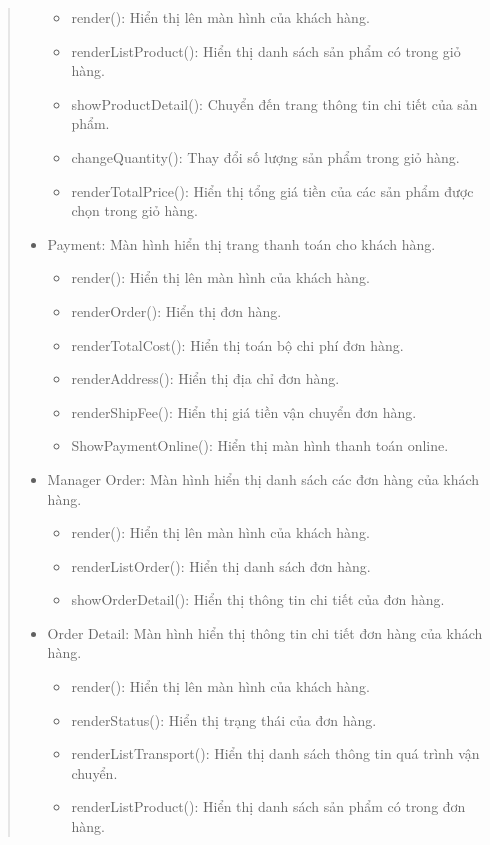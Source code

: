 \begin{quote}
\begin{itemize}
			\begin{itemize}
				\item render(): Hiển thị lên màn hình của khách hàng.
				\item renderListProduct(): Hiển thị danh sách sản phẩm có trong giỏ hàng.
				\item showProductDetail(): Chuyển đến trang thông tin chi tiết của sản phẩm.
				\item changeQuantity(): Thay đổi số lượng sản phẩm trong giỏ hàng.
				\item renderTotalPrice(): Hiển thị tổng giá tiền của các sản phẩm được chọn trong giỏ hàng.
			\end{itemize}
		\item Payment: Màn hình hiển thị trang thanh toán cho khách hàng.
			\begin{itemize}
				\item render(): Hiển thị lên màn hình của khách hàng.
				\item renderOrder(): Hiển thị đơn hàng.
				\item renderTotalCost(): Hiển thị toán bộ chi phí đơn hàng.
				\item renderAddress(): Hiển thị địa chỉ đơn hàng.
				\item renderShipFee(): Hiển thị giá tiền vận chuyển đơn hàng.
				\item ShowPaymentOnline(): Hiển thị màn hình thanh toán online.
			\end{itemize}
		\item Manager Order: Màn hình hiển thị danh sách các đơn hàng của khách hàng.
			\begin{itemize}
				\item render(): Hiển thị lên màn hình của khách hàng.
				\item renderListOrder(): Hiển thị danh sách đơn hàng.
				\item showOrderDetail(): Hiển thị thông tin chi tiết của đơn hàng.
			\end{itemize}
		\item Order Detail: Màn hình hiển thị thông tin chi tiết đơn hàng của khách hàng.
			\begin{itemize}
				\item render(): Hiển thị lên màn hình của khách hàng.
				\item renderStatus(): Hiển thị trạng thái của đơn hàng.
				\item renderListTransport(): Hiển thị danh sách thông tin quá trình vận chuyển.
				\item renderListProduct(): Hiển thị danh sách sản phẩm có trong đơn hàng.

\end{itemize}
\end{itemize}
\end{quote}
